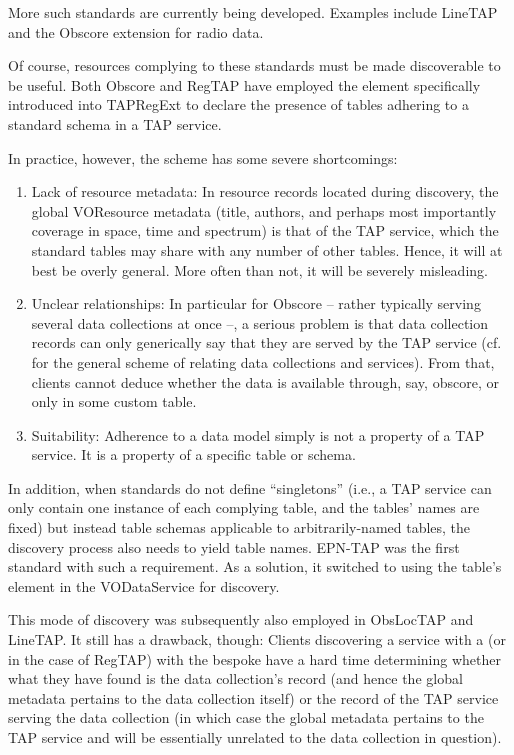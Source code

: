 \documentclass[11pt,a4paper]{ivoa}
\begin{document}
More such standards are currently being developed. Examples include LineTAP
\citep{wd:linetap23} and the Obscore extension for radio data.

Of course, resources complying to these standards must be made
discoverable to be useful.  Both Obscore and RegTAP have employed the
 element specifically introduced into TAPRegExt
\citep{2012ivoa.spec.0827D} to declare the presence of tables adhering
to a standard schema in a TAP service.

In practice, however, the  scheme
has some severe shortcomings:

\begin{enumerate}
\item Lack of resource metadata: In resource records located during
discovery, the global VOResource metadata (title, authors, and perhaps
most importantly coverage in space, time and spectrum) is that of the
TAP service, which the standard tables may share with any number of
other tables.  Hence, it will at best be overly general.  More often
than not, it will be severely misleading.

\item Unclear relationships: In particular for Obscore -- rather
typically serving several data collections at once --, a serious
problem is that data collection records can only generically say
that they are served by the TAP service (cf.~\citet{2019ivoa.spec.0520D}
for the general scheme of relating data collections and services).  From
that, clients cannot deduce whether the data is available through, say,
obscore, or only in some custom table.

\item Suitability: Adherence to a data model simply is not a property of a
TAP service.  It is a property of a specific table or schema.
\end{enumerate}

In addition, when standards do not define ``singletons'' (i.e., a TAP
service can only contain one instance of each
complying table, and the tables' names are
fixed) but instead table schemas applicable to arbitrarily-named tables,
the discovery process also needs to yield table names.
EPN-TAP was the first standard with such a requirement.  As a
solution, it switched to using the table's  element in
the VODataService \citep{2021ivoa.spec.1102D}  for
discovery.

This mode of discovery was subsequently also employed in ObsLocTAP and
LineTAP.  It still has a drawback, though: Clients discovering a service
with a  (or  in the case of RegTAP) with the
bespoke  have a hard time determining whether what they
have found is the data collection's record (and hence the global
metadata pertains to the data collection itself) or the record of the
TAP service serving the data collection (in which case the global
metadata pertains to the TAP service and will be essentially unrelated
to the data collection in question).
\end{document}

